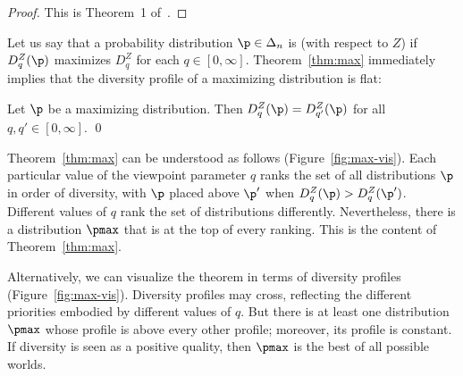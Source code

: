 \begin{proof}
This is Theorem~1 of~\cite{MDBB}.
\end{proof}

Let us say that a probability distribution $\p \in \Delta_n$ is
%
% 
%
% 
(with respect to $Z$) if $D_q^Z(\p)$ maximizes $D_q^Z$ for each $q \in [0,
  \infty]$.  Theorem~\ref{thm:max} immediately implies
that the diversity profile of a maximizing distribution is flat:

\begin{cor}
Let $\p$ be a maximizing distribution.  Then $D_q^Z(\p) = D_{q'}^Z(\p)$ for
all $q, q' \in [0, \infty]$.
\qed
\end{cor}

Theorem~\ref{thm:max} can be understood as follows
(Figure~\ref{fig:max-vis}).  Each particular value of the
viewpoint%
%
% 
parameter $q$ ranks the set of all distributions $\p$ in order of
diversity, with $\p$ placed above $\p'$ when $D_q^Z(\p) > D_q^Z(\p')$.
Different values of $q$ rank the set of distributions differently.
Nevertheless, there is a distribution $\pmax$ that is at the top of every
ranking.  This is the content of Theorem~\ref{thm:max}.

Alternatively, we can visualize the theorem in terms of diversity profiles
(Figure~\ref{fig:max-vis}).  Diversity profiles may cross,
reflecting the different priorities embodied by different values of $q$.
But there is at least one distribution $\pmax$ whose profile is above every
other profile; moreover, its profile is constant.  If diversity is seen as
a positive quality, then $\pmax$ is the best of all possible worlds.

